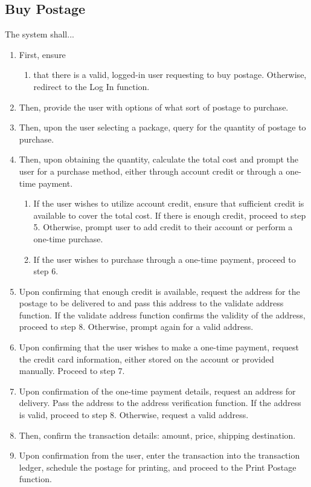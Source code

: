 \documentclass{scrreprt}
\begin{document}
\subsection{Buy Postage}

The system shall...

\begin{enumerate}
\item First, ensure
\begin{enumerate}
\item that there is a valid, logged-in user requesting to buy postage.
Otherwise, redirect to the Log In function.
\end{enumerate}
\item Then, provide the user with options of what sort of postage to purchase.
\item Then, upon the user selecting a package, query for the quantity of
postage to purchase.
\item Then, upon obtaining the quantity, calculate the total cost and prompt
the user for a purchase method, either through account credit or through a
one-time payment.
\begin{enumerate}
\item If the user wishes to utilize account credit, ensure that sufficient
credit is available to cover the total cost. If there is enough credit, proceed
to step 5. Otherwise, prompt user to add credit to their account or perform a
one-time purchase.
\item If the user wishes to purchase through a one-time payment, proceed to
step 6.
\end{enumerate}
\item Upon confirming that enough credit is available, request the address for
the postage to be delivered to and pass this address to the validate address
function. If the validate address function confirms the validity of the
address, proceed to step 8. Otherwise, prompt again for a valid address.
\item Upon confirming that the user wishes to make a one-time payment, request
the credit card information, either stored on the account or provided manually.
Proceed to step 7.
\item Upon confirmation of the one-time payment details, request an address for
delivery. Pass the address to the address verification function. If the address
is valid, proceed to step 8. Otherwise, request a valid address.
\item Then, confirm the transaction details: amount, price, shipping
destination.
\item Upon confirmation from the user, enter the transaction into the
transaction ledger, schedule the postage for printing, and proceed to the Print
Postage function.
\end{enumerate}
\end{document}
